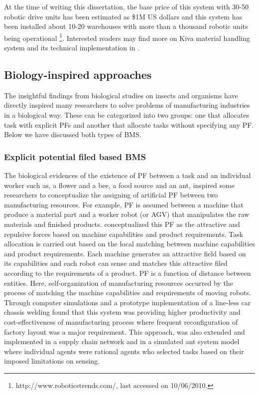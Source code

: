 At the  time of writing this dissertation,  the base price of this system with 30-50 robotic drive units has been estimated as \$1M US dollars and this system has been installed about 10-20 warehouses with more than a thousand robotic units being operational \footnote{http://www.roboticstrends.com/, last accessed on 10/06/2010.}.  Interested readers may find more on Kiva material handling system and its technical implementation in .
\subsection{Biology-inspired approaches}
The insightful findings from biological studies on insects and organisms have directly inspired many researchers to solve problems of manufacturing industries in a biological way. These can be categorized into two groups: one that allocates task with explicit  \acfp{PF} and another that allocate tasks without specifying any PF. Below we have discussed both types of \acf{BMS}.
\subsubsection*{Explicit potential filed based BMS}
The biological evidences of the existence of PF between a task and an individual worker such as, a flower and a bee, a food source and an ant, inspired some researchers to conceptualize the assigning of artificial PF between two manufacturing resources. For example, PF is assumed between a machine that produce a material part and a worker robot (or AGV) that manipulates the raw materials and finished products. \cite{Ueda2006} conceptualized this PF as the attractive and repulsive forces based on machine capabilities and product requirements. Task allocation is carried out based on the local matching between machine capabilities and product requirements. Each machine generates an attractive field based on its capabilities and each robot can sense and matches this attractive filed according to the requirements of a product. PF is a function of distance between entities. Here, self-organization of manufacturing resources occurred by the process of matching the machine capabilities and requirements of moving robots. Through computer simulations and a prototype implementation of a line-less car chassis welding \cite{Ueda2006} found that this system was providing higher productivity and cost-effectiveness of manufacturing process where frequent reconfiguration of factory layout was a major requirement. This approach, was also extended and implemented in a supply chain network and in a simulated ant system model where individual agents were rational agents who selected tasks based on their imposed limitations on sensing.
